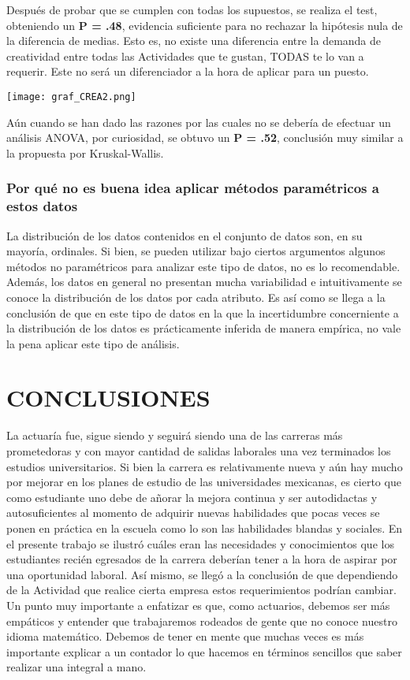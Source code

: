 \documentclass{article}
\begin{document}
Después de probar que se cumplen con todas los supuestos, se realiza el test, obteniendo un \textbf{P = .48}, evidencia suficiente para no rechazar la hipótesis nula de la diferencia de medias. Esto es, no existe una diferencia entre la demanda de creatividad entre todas las Actividades que te gustan, TODAS te lo van a requerir. Este no será un diferenciador a la hora de aplicar para un puesto.  


\begin{center}
    \texttt{[image: graf\_CREA2.png]}
\end{center}

Aún cuando se han dado las razones por las cuales no se debería de efectuar un análisis ANOVA, por curiosidad, se obtuvo un \textbf{P = .52}, conclusión muy similar a la propuesta por Kruskal-Wallis. 


\subsubsection{Por qué no es buena idea aplicar métodos paramétricos a estos datos}

La distribución de los datos contenidos en el conjunto de datos son, en su mayoría, ordinales. Si bien, se pueden utilizar bajo ciertos argumentos algunos métodos no paramétricos para analizar este tipo de datos, no es lo recomendable. Además, los datos en general no presentan mucha variabilidad e intuitivamente se conoce la distribución de los datos por cada atributo. Es así como se llega a la conclusión de que en este tipo de datos en la que la incertidumbre concerniente a la distribución de los datos es prácticamente inferida de manera empírica, no vale la pena aplicar este tipo de análisis. 




\section{CONCLUSIONES}

La actuaría fue, sigue siendo y seguirá siendo una de las carreras más prometedoras y con mayor cantidad de salidas laborales una vez terminados los estudios universitarios. Si bien la carrera es relativamente nueva y aún hay mucho por mejorar en los planes de estudio de las universidades mexicanas, es cierto que como estudiante uno debe de añorar la mejora continua y ser autodidactas y autosuficientes al momento de adquirir nuevas habilidades que pocas veces se ponen en práctica en la escuela como lo son las habilidades blandas y sociales. En el presente trabajo se ilustró cuáles eran las necesidades y conocimientos que los estudiantes recién egresados de la carrera deberían tener a la hora de aspirar por una oportunidad laboral. Así mismo, se llegó a la conclusión de que dependiendo de la Actividad que realice cierta empresa estos requerimientos podrían cambiar. Un punto muy importante a enfatizar es que, como actuarios, debemos ser más empáticos y entender que trabajaremos rodeados de gente que no conoce nuestro idioma matemático. Debemos de tener en mente que muchas veces es más importante explicar a un contador lo que hacemos en términos sencillos que saber realizar una integral a mano. \\
\end{document}
